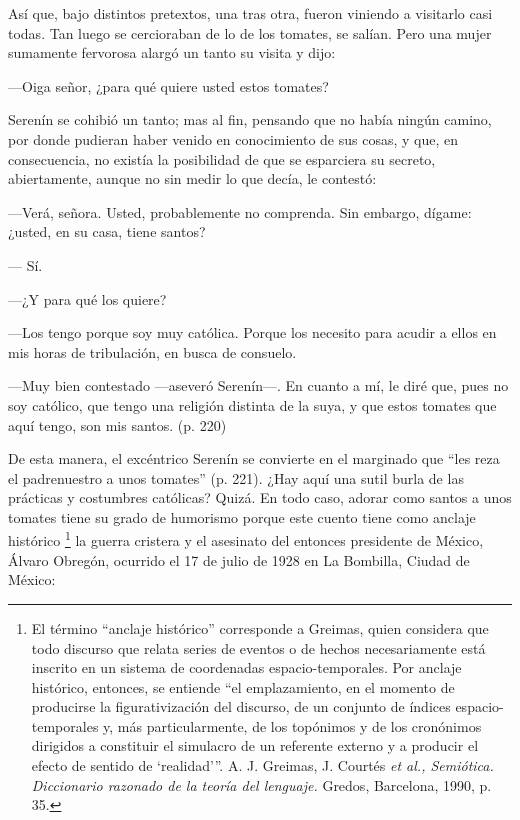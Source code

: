 \documentclass[14pt,twoside,final]{extbook} %
\let\oldfootnote\footnote
\renewcommand\footnote[1]{%
\oldfootnote{\hspace{1mm}#1}}
\begin{document}
Así que, bajo distintos pretextos, una tras otra, fueron viniendo a visitarlo casi todas. Tan luego se cercioraban de lo de los tomates, se salían. Pero una mujer sumamente fervorosa alargó un tanto su visita y dijo:
\begin{quoting}
---Oiga señor, ¿para qué quiere usted estos tomates?

Serenín se cohibió un tanto; mas al fin, pensando que no había ningún camino, por donde pudieran haber venido en conocimiento de sus cosas, y que, en consecuencia, no existía la posibilidad de que se esparciera su secreto, abiertamente, aunque no sin medir lo que decía, le contestó:

---Verá, señora. Usted, probablemente no comprenda. Sin embargo, dígame: ¿usted, en su casa, tiene santos?

--- Sí.

---¿Y para qué los quiere?

---Los tengo porque soy muy católica. Porque los necesito para acudir a ellos en mis horas de tribulación, en busca de consuelo.

---Muy bien contestado ---aseveró Serenín---. En cuanto a mí, le diré que, pues no soy católico, que tengo una religión distinta de la suya, y que estos tomates que aquí tengo, son mis santos. (p. 220)
\end{quoting}
De esta manera, el excéntrico Serenín se convierte en el marginado que ``les reza el padrenuestro a unos tomates'' (p. 221). ¿Hay aquí una sutil burla de las prácticas y costumbres católicas? Quizá. En todo caso, adorar como santos a unos tomates tiene su grado de humorismo porque este cuento tiene como anclaje histórico\footnote{El término ``anclaje histórico'' corresponde a Greimas, quien considera que todo discurso que relata series de eventos o de hechos necesariamente está inscrito en un sistema de coordenadas \mbox{espacio-temporales}. Por anclaje histórico, entonces, se entiende ``el emplazamiento, en el momento de producirse la figurativización del discurso, de un conjunto de índices espacio-temporales y, más particularmente, de los topónimos y de los cronónimos dirigidos a constituir el simulacro de un referente externo y a producir el efecto de sentido de `realidad'{}''. A. J. Greimas, J. Courtés \textit{et al., Semiótica. Diccionario razonado de la teoría del lenguaje.} Gredos, Barcelona, 1990, p. 35.} la guerra cristera y el asesinato del entonces presidente de México, Álvaro Obregón, ocurrido el 17 de julio de 1928 en La Bombilla, Ciudad de México:
\end{document}
